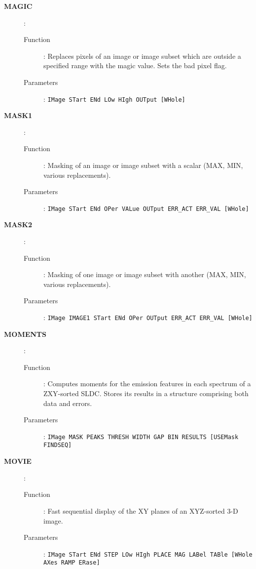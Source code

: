 \begin{description}
\item[\large\bf MAGIC]:
   \begin{description}
   \item[Function]:
      Replaces pixels of an image or image subset which are outside a
      specified range with the magic value. Sets the bad pixel flag.
   \item[Parameters]:
      {\tt IMage STart ENd LOw HIgh OUTput [WHole]}
   \end{description}

\item[\large\bf MASK1]:
   \begin{description}
   \item[Function]:
      Masking of an image or image subset with a scalar (MAX, MIN, various
      replacements).
   \item[Parameters]:
      {\tt IMage STart ENd OPer VALue OUTput ERR\_ACT ERR\_VAL [WHole]}
   \end{description}

\item[\large\bf MASK2]:
   \begin{description}
   \item[Function]:
      Masking of one image or image subset with another (MAX, MIN, various
      replacements).
   \item[Parameters]:
      {\tt IMage IMAGE1 STart ENd OPer OUTput ERR\_ACT ERR\_VAL [WHole]}
   \end{description}

\item[\large\bf MOMENTS]:
   \begin{description}
   \item[Function]:
      Computes moments for the emission features in each spectrum of a
      ZXY-sorted SLDC. Stores its results in a structure comprising both data
      and errors.
   \item[Parameters]:
      {\tt IMage MASK PEAKS THRESH WIDTH GAP BIN RESULTS [USEMask \\
      FINDSEQ]}
   \end{description}

\item[\large\bf MOVIE]:
   \begin{description}
   \item[Function]:
      Fast sequential display of the XY planes of an XYZ-sorted 3-D image.
   \item[Parameters]:
      {\tt IMage STart ENd STEP LOw HIgh PLACE MAG LABel TABle [WHole\\
      AXes RAMP ERase]}
   \end{description}


\end{description}
